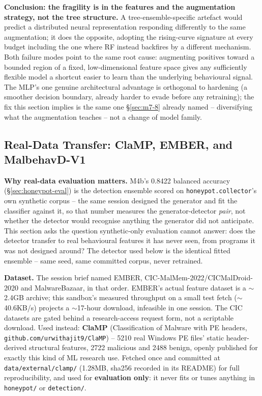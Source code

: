 \documentclass[conference]{IEEEtran}
\begin{document}
\textbf{Conclusion: the fragility is in the features and the augmentation strategy, not the tree
structure.} A tree-ensemble-specific artefact would predict a distributed neural representation
responding differently to the same augmentation; it does the opposite, adopting the rising-curve
signature at every budget including the one where RF instead backfires by a different mechanism.
Both failure modes point to the same root cause: augmenting positives toward a bounded region of a
fixed, low-dimensional feature space gives any sufficiently flexible model a shortcut easier to
learn than the underlying behavioural signal. The MLP's one genuine architectural advantage is
orthogonal to hardening (a smoother decision boundary, already harder to evade before any
retraining); the fix this section implies is the same one \S\ref{sec:m7-8} already named --
diversifying what the augmentation teaches -- not a change of model family.

\subsection{Real-Data Transfer: ClaMP, EMBER, and MalbehavD-V1}
\label{sec:m7-7}

\textbf{Why real-data evaluation matters.} M4b's 0.8422 balanced accuracy
(\S\ref{sec:honeypot-eval}) is the detection ensemble scored on \texttt{honeypot.collector}'s own
synthetic corpus -- the same session designed the generator and fit the classifier against it, so
that number measures the generator-detector \emph{pair}, not whether the detector would recognise
anything the generator did not anticipate. This section asks the question synthetic-only
evaluation cannot answer: does the detector transfer to real behavioural features it has never
seen, from programs it was not designed around? The detector used below is the identical fitted
ensemble -- same seed, same committed corpus, never retrained.

\textbf{Dataset.} The session brief named EMBER, CIC-MalMem-2022/CICMalDroid-2020 and
MalwareBazaar, in that order. EMBER's actual feature dataset is a $\sim$2.4GB archive; this
sandbox's measured throughput on a small test fetch ($\sim$40.6KB/s) projects a $\sim$17-hour
download, infeasible in one session. The CIC datasets are gated behind a research-access request
form, not a scriptable download. Used instead: \textbf{ClaMP} (Classification of Malware with PE
headers, \texttt{github.com/urwithajit9/ClaMP}) -- 5210 real Windows PE files' static
header-derived structural features, 2722 malicious and 2488 benign, openly published for exactly
this kind of ML research use. Fetched once and committed at \texttt{data/external/clamp/} (1.28MB,
sha256 recorded in its README) for full reproducibility, and used for \textbf{evaluation only}: it
never fits or tunes anything in \texttt{honeypot/} or \texttt{detection/}.
\end{document}
